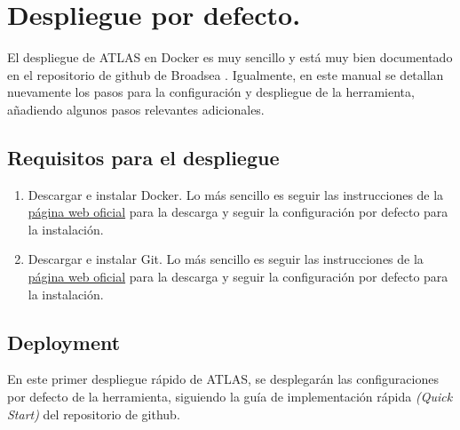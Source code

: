 \chapter{Despliegue por defecto.} \label{cap:02Despliegue}

El despliegue de ATLAS en Docker es muy sencillo y está muy bien documentado en el repositorio de github de Broadsea \cite{githubBroadsea}.  Igualmente, en este manual se detallan nuevamente los pasos para la configuración y despliegue de la herramienta, añadiendo algunos pasos relevantes adicionales.

\section{Requisitos para el despliegue}

\begin{enumerate}
    \item Descargar e instalar Docker. Lo más sencillo es seguir las instrucciones de la \href{https://docs.docker.com/engine/install/}{página web oficial} para la descarga y seguir la configuración por defecto para la instalación.
    
    \item Descargar e instalar Git. Lo más sencillo es seguir las instrucciones de la \href{https://git-scm.com/downloads}{página web oficial} para la descarga y seguir la configuración por defecto para la instalación.
\end{enumerate}

\section{Deployment} \label{cap:02Deployment}

En este primer despliegue rápido de ATLAS, se desplegarán las configuraciones por defecto de la herramienta, siguiendo la guía de implementación rápida \textit{(Quick Start)} del repositorio de github.

